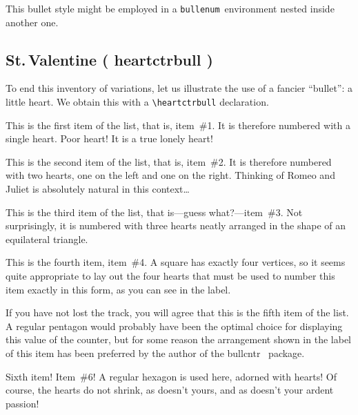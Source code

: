 \documentclass[a4paper]{article}
\DeclareRobustCommand*{\command}[1]{%
	{\texorpdfstring{\normalfont\ttfamily \char\escapechar}{\pdfbslash}#1}%
}
\DeclareRobustCommand*{\packlass}[1]{%
	{\texorpdfstring{\normalfont \sffamily}{}#1}%
}
\DeclareRobustCommand*{\env}[1]{\texttt{#1}}
\newcommand*{\Bullcntr}{bullcntr}
\newcommand*{\bull}{\packlass{\Bullcntr}}
\newcommand*{\tbull}{the \bull\ package}
\newcommand*{\Bullenum}{bullenum}
\newcommand*{\beenv}{\env{\Bullenum}}
\newcommand*{\pdfbslash}{}
{\catcode`\|=0 |catcode`|\=12 |gdef|pdfbslash{\\}}
\begin{document}
This bullet style might be employed in a \beenv\ environment nested
inside another one.



\subsection{St.\texorpdfstring{\,}{ }Valentine (\command{heartctrbull})}
\label{SS:Xmp-Hearts}

To end this inventory of variations, let us illustrate the use of a
fancier ``bullet'': a little heart.  We obtain this with a
\verb|\heartctrbull| declaration.

\begin{bullenum}
	\heartctrbull

	\item\label{Hearts-1}
		This is the first item of the list, that is, item~\#1.  It is
		therefore numbered with a single heart.  Poor heart!  It is a
		true lonely heart!

	\item
		This is the second item of the list, that is, item~\#2.  It is
		therefore numbered with two hearts, one on the left and one on
		the right.  Thinking of Romeo and Juliet is absolutely natural
		in this context\ldots

	\item\label{Hearts-3}
		This is the third item of the list, that is---guess
		what?---item~\#3.  Not surprisingly, it is numbered with three
		hearts neatly arranged in the shape of an equilateral
		triangle.

	\item\label{Hearts-4}
		This is the fourth item, item~\#4.  A square has exactly four
		vertices, so it seems quite appropriate to lay out the four
		hearts that must be used to number this item exactly in this
		form, as you can see in the label.

	\item\label{Hearts-5}
		If you have not lost the track, you will agree that this is
		the fifth item of the list.  A regular pentagon would probably
		have been the optimal choice for displaying this value of the
		counter, but for some reason the arrangement shown in the
		label of this item has been preferred by the author of \tbull.

	\item
		Sixth item!  Item~\#6!  A regular hexagon is used here,
		adorned with hearts!  Of course, the hearts do not shrink, as
		doesn't yours, and as doesn't your ardent passion!


\end{bullenum}
\end{document}
